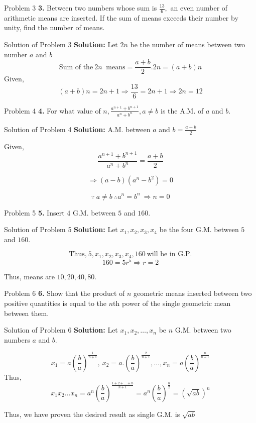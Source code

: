 \documentclass[aspectratio=1610,8pt]{beamer}
\begin{document}
\begin{frame}{Problem 3}
  \textbf{3.} Between two numbers whose sum is $\frac{13}{6},$ an even number
  of arithmetic means are inserted. If the sum of means exceeds their number by
  unity, find the number of means.
\end{frame}
\begin{frame}{Solution of Problem 3}
  \textbf{Solution:} Let $2n$ be the number of means between two number $a$ and
  $b$
  $$\text{Sum of the}~2n~\text{~means} = \frac{a + b}{2}.2n = (a + b)n$$
  Given, $$(a + b)n = 2n + 1 \Rightarrow \frac{13}{6} = 2n + 1 \Rightarrow 2n
  = 12$$
\end{frame}
\begin{frame}{Problem 4}
  \textbf{4.} For what value of $n, \frac{a^{n + 1} + b^{n + 1}}{a^n + b^n},
  a\neq b$ is the A.M. of $a$ and $b.$
\end{frame}
\begin{frame}{Solution of Problem 4}
  \textbf{Solution:} A.M. between $a$ and $b = \frac{a + b}{2}$

  Given, $$\frac{a^{n + 1} + b^{n + 1}}{a^n + b^n} = \frac{a + b}{2}$$

  $$\Rightarrow (a - b)(a^n - b^2) = 0$$

  $$\because~a\neq b~\therefore a^n = b^n~\Rightarrow n = 0$$
\end{frame}
\begin{frame}{Problem 5}
  \textbf{5.} Insert $4$ G.M. between $5$ and $160.$
\end{frame}
\begin{frame}{Solution of Problem 5}
  \textbf{Solution:} Let $x_1, x_2, x_3, x_4$ be the four G.M. between $5$ and
  $160.$

  $$\text{Thus,}~ 5, x_1, x_2, x_3, x_4, 160~\text{will be in G.P.}$$
  $$160 = 5r^5 \Rightarrow r = 2$$

  Thus, means are $10, 20, 40, 80.$
\end{frame}
\begin{frame}{Problem 6}
  \textbf{6.} Show that the product of $n$ geometric means inserted between two
  positive quantities is equal to the $n$th power of the single geometric mean
  between them.
\end{frame}
\begin{frame}{Solution of Problem 6}
  \textbf{Solution:} Let $x_1, x_2, \ldots, x_n$ be $n$ G.M. between two
  numbers $a$ and $b.$

  $$x_1 = a\left(\frac{b}{a}\right)^{\frac{1}{n + 1}},~x_2 =
  a.\left(\frac{b}{a}\right)^{\frac{2}{n + 1}}, \ldots, x_n =
  a\left(\frac{b}{a}\right)^{\frac{n}{n + 1}}$$
  Thus,
  $$x_1x_2\ldots x_n = a^n\left(\frac{b}{a}\right)^{\frac{1 + 2 + \ldots + n}{n
      + 1}} = a^n\left(\frac{b}{a}\right)^{\frac{n}{2}} = (\sqrt{ab})^n$$

  Thus, we have proven the desired result as single G.M. is $\sqrt{ab}$
\end{frame}
\end{document}
